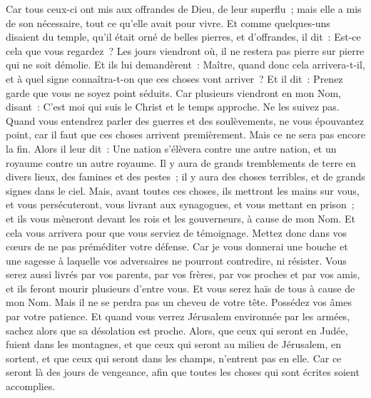 \begin{multicols}{2}
Car tous ceux-ci ont mis aux offrandes de Dieu, de leur superflu~; mais elle a mis de son nécessaire, tout ce qu'elle avait pour vivre.
Et comme quelques-uns disaient du temple, qu'il était orné de belles pierres, et d'offrandes, il dit~:
Est-ce cela que vous regardez~? Les jours viendront où, il ne restera pas pierre sur pierre qui ne soit démolie.
Et ils lui demandèrent~: Maître, quand donc cela arrivera-t-il, et à quel signe connaîtra-t-on que ces choses vont arriver~?
Et il dit~: Prenez garde que vous ne soyez point séduits. Car plusieurs viendront en mon Nom, disant~: C'est moi qui suis le Christ et le temps approche. Ne les suivez pas.
Quand vous entendrez parler des guerres et des soulèvements, ne vous épouvantez point, car il faut que ces choses arrivent premièrement. Mais ce ne sera pas encore la fin.
Alors il leur dit~: Une nation s'élèvera contre une autre nation, et un royaume contre un autre royaume.
Il y aura de grands tremblements de terre en divers lieux, des famines et des pestes~; il y aura des choses terribles, et de grands signes dans le ciel.
Mais, avant toutes ces choses, ils mettront les mains sur vous, et vous persécuteront, vous livrant aux synagogues, et vous mettant en prison~; et ils vous mèneront devant les rois et les gouverneurs, à cause de mon Nom.
Et cela vous arrivera pour que vous serviez de témoignage.
Mettez donc dans vos cœurs de ne pas préméditer votre défense.
Car je vous donnerai une bouche et une sagesse à laquelle vos adversaires ne pourront contredire, ni résister.
Vous serez aussi livrés par vos parents, par vos frères, par vos proches et par vos amis, et ils feront mourir plusieurs d'entre vous.
Et vous serez haïs de tous à cause de mon Nom.
Mais il ne se perdra pas un cheveu de votre tête.
Possédez vos âmes par votre patience.
Et quand vous verrez Jérusalem environnée par les armées, sachez alors que sa désolation est proche.
Alors, que ceux qui seront en Judée, fuient dans les montagnes, et que ceux qui seront au milieu de Jérusalem, en sortent, et que ceux qui seront dans les champs, n'entrent pas en elle.
Car ce seront là des jours de vengeance, afin que toutes les choses qui sont écrites soient accomplies.

\end{multicols}
